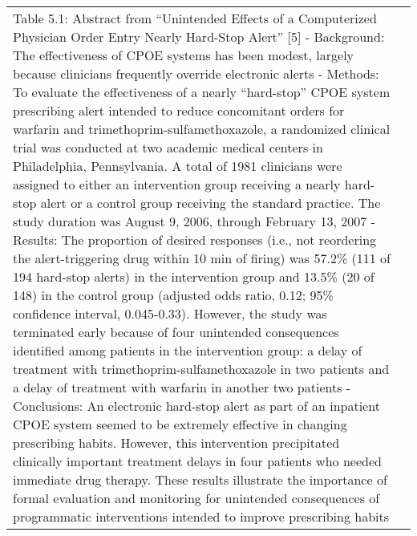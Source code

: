 {\begin{landscape}
\begin{longtable}{p{3cm}p{}}
    Table 5.1: Abstract from ``Unintended Effects of a Computerized Physician Order Entry Nearly Hard-Stop Alert'' [5]
    - Background: The effectiveness of CPOE systems has been modest, largely because clinicians frequently override electronic alerts
    - Methods: To evaluate the effectiveness of a nearly ``hard-stop'' CPOE system prescribing alert intended to reduce concomitant orders for warfarin and trimethoprim-sulfamethoxazole, a randomized clinical trial was conducted at two academic medical centers in Philadelphia, Pennsylvania. A total of 1981 clinicians were assigned to either an intervention group receiving a nearly hard-stop alert or a control group receiving the standard practice.
    The study duration was August 9, 2006, through February 13, 2007
    - Results: The proportion of desired responses (i.e., not reordering the alert-triggering drug within 10 min of firing) was 57.2\% (111 of 194 hard-stop alerts) in the intervention group and 13.5\% (20 of 148) in the control group (adjusted odds ratio, 0.12; 95\% confidence interval, 0.045-0.33). However, the study was terminated early because of four unintended consequences identified among patients in the intervention group: a delay of treatment with trimethoprim-sulfamethoxazole in two patients and a delay of treatment with warfarin in another two patients
    - Conclusions: An electronic hard-stop alert as part of an inpatient CPOE system seemed to be extremely effective in changing prescribing habits.
    However, this intervention precipitated clinically important treatment delays in four patients who needed immediate drug therapy.
    These results illustrate the importance of formal evaluation and monitoring for unintended consequences of programmatic interventions intended to improve prescribing habits


\end{longtable}
\end{landscape}}
